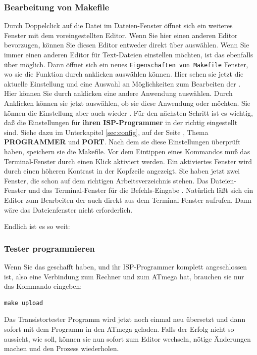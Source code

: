 \subsubsection{Bearbeitung von Makefile}
Durch \LMB Doppelclick auf die  Datei im Dateien-Fenster öffnet sich ein weiteres Fenster
mit dem voreingestellten Editor. Wenn Sie hier einen anderen Editor bevorzugen, können Sie
diesen Editor entweder direkt über \RMB {} auswählen.
Wenn Sie immer einen anderen Editor für Text-Dateien einstellen möchten,
ist das ebenfalls über \RMB  {} möglich.
Dann öffnet sich ein neues \verb"Eigenschaften von Makefile" Fenster, wo sie die
Funktion  durch \RMB anklicken auswählen können.
Hier sehen sie jetzt die aktuelle Einstellung und eine Auswahl an Möglichkeiten zum Bearbeiten
der . Hier können Sie durch \LMB anklicken eine andere Anwendung auswählen.
Durch \LMB Anklicken können sie jetzt auswählen, ob sie diese Anwendung 
oder  möchten.
Sie können die Einstellung aber auch wieder .
Für den nächsten Schritt ist es wichtig, daß die Einstellungen für
\textbf{ihren ISP-Programmer} in der  richtig eingestellt sind.
Siehe dazu im Unterkapitel \ref{sec:config}, auf der Seite \pageref{sec:config-Prog},
Thema \textbf{PROGRAMMER} und \textbf{PORT}.
Nach dem sie diese Einstellungen überprüft haben, speichern sie die Makefile.
Vor dem Eintippen eines Kommandos muß das Terminal-Fenster durch einen \LMB Klick
aktiviert werden. Ein aktiviertes Fenster wird durch einen höheren Kontrast in der
Kopfzeile angezeigt.
Sie haben jetzt zwei Fenster, die schon auf dem richtigen Arbeitsverzeichnis stehen.
Das Dateien-Fenster und das Terminal-Fenster für die Befehls-Eingabe .
Natürlich läßt sich ein Editor zum Bearbeiten der  auch direkt
aus dem Terminal-Fenster aufrufen. Dann wäre das Dateienfenster nicht erforderlich.


Endlich ist es so weit:
\subsubsection{Tester programmieren}
Wenn Sie das geschafft haben, und ihr ISP-Programmer komplett angeschlossen ist, also eine Verbindung
zum Rechner und zum ATmega hat, brauchen sie nur das Kommando eingeben:
\begin{large} \vspace{-0.4em} \begin{verbatim}
make upload
\end{verbatim} \end{large}
Das Transistortester Programm wird jetzt noch einmal neu übersetzt und dann sofort
mit dem Programm  in den ATmega geladen.
Falls der Erfolg nicht so aussieht, wie soll, können sie nun sofort zum  Editor wechseln,
nötige Änderungen machen und den Prozess wiederholen.

